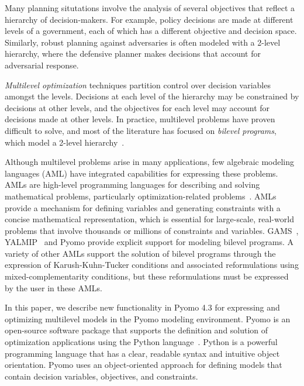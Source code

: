 
\lstset{language=Python}
\lstset{aboveskip=1em,belowskip=1em,showspaces=false,showstringspaces=false}






Many planning situtations involve the analysis of several objectives
that reflect a hierarchy of decision-makers.  For example, policy
decisions are made at different levels of a government, each of
which has a different objective and decision space.  Similarly, robust planning
against adversaries is often modeled with a 2-level hierarchy, where
the defensive planner makes decisions that account for adversarial
response.

\textit{Multilevel optimization} techniques partition control over
decision variables amongst the levels.  Decisions at each level of
the hierarchy may be constrained by decisions at other levels, and
the objectives for each level may account for decisions made at
other levels.  In practice, multilevel problems have proven difficult
to solve, and most of the literature has focused on \textit{bilevel
programs}, which model a 2-level hierarchy~\citep{ColMarSav07}.

Although multilevel problems arise in many applications, few algebraic
modeling languages (AML) have integrated capabilities for expressing
these problems.  AMLs are high-level programming languages for
describing and solving mathematical problems, particularly
optimization-related problems~\citep{Kal04}.  AMLs provide a mechanism
for defining variables and generating constraints with a concise
mathematical representation, which is essential for large-scale,
real-world problems that involve thousands or millions of constraints
and variables.  GAMS~\citep{GAMS}, YALMIP~\cite{Lof04} and Pyomo
provide explicit support for modeling bilevel programs.  A variety
of other AMLs support the solution of bilevel programs through the
expression of Karush-Kuhn-Tucker conditions and associated
reformulations using mixed-complementarity conditions, but these
reformulations must be expressed by the user in these AMLs.

In this paper, we describe new functionality in Pyomo 4.3 for
expressing and optimizing multilevel models in the Pyomo modeling
environment.  Pyomo is an open-source software package that supports
the definition and solution of optimization applications using the
Python language~\cite{pyomotrac,pyomoweb,HarWatWoo11,HarLaiWatWoo12}.
Python is a powerful programming language that has a clear, readable
syntax and intuitive object orientation.  Pyomo uses an object-oriented
approach for defining models that contain decision variables,
objectives, and constraints.  

